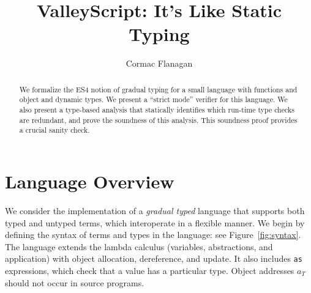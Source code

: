 \documentclass{article}
\newcommand{\myclearpage}{}
\renewcommand{\myclearpage}{\clearpage}
\newcommand{\comment}[1]{}
\newcommand{\Int}{\t{Int}}
\newcommand{\Bool}{\t{Bool}}
\renewcommand{\t}[1]{{\tt #1}}
\begin{document}
\title{ValleyScript: It's Like Static Typing
}
\author{Cormac Flanagan}


\maketitle

\begin{abstract}
We formalize the ES4 notion of gradual typing for a small language with functions and object
and dynamic types.
We present a ``strict mode'' verifier for this language.
We also present a type-based analysis that statically identifies which run-time type checks are redundant, 
and prove the soundness of this analysis. 
This soundness proof provides a crucial sanity check.
\end{abstract}

\comment{
\section{Change Log}
\begin{itemize}
\item
6 Oct: extended with generic function, as a warm-up for implementing all this in the verifier.
\item
8 Nov: extended with conversion from $\Int$ to $\Bool$.
\item
14 Nov: extended with generic functions.
\item
14 Nov: added wrap as a type constructor.
\item 
20 Nov: rework based on allocated and current types
\item
26 Nov: rework with two subtype relations
\item
27 Nov: rework with ideas from Siek+Taha
\item
todo: check proofs for like, wrap, and int to bool conversions
\item
todo: added typedefs and generics
\item
todo: resolve contravariant subtyping on function domains
\end{itemize}
}
\myclearpage
\section{Language Overview}

We consider the implementation of a \emph{gradual typed} language that supports both
typed and untyped terms, which interoperate in a flexible manner.
We begin by defining the syntax of terms and types in the language: see Figure~\ref{fig:syntax}.
The language extends  the lambda calculus (variables, abstractions, and application)
with object allocation, dereference, and update. 
It also includes \t{as} expressions, which check that a value has a particular type.
Object addresses $a_T$ should not occur in source programs.
\end{document}
